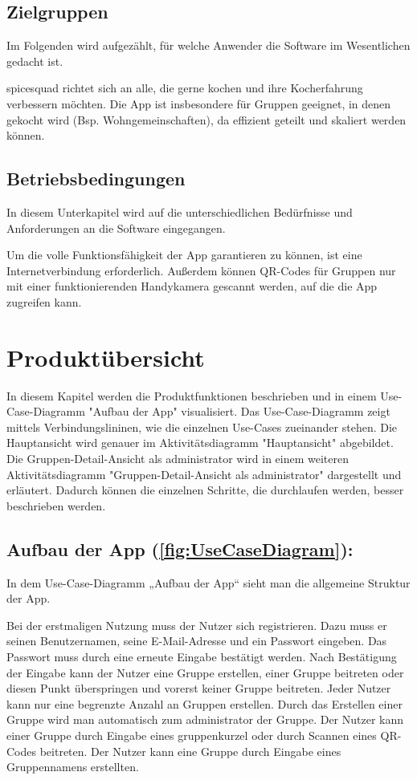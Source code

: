 \documentclass[parskip=full]{scrartcl}
\begin{document}
\subsection{Zielgruppen}
Im Folgenden wird aufgezählt, für welche Anwender die Software im Wesentlichen gedacht ist. \par
\gls{spicesquad} richtet sich an alle, die gerne kochen und ihre Kocherfahrung verbessern möchten.
Die App ist insbesondere für Gruppen geeignet, in denen gekocht wird (Bsp. Wohngemeinschaften), da  effizient geteilt und skaliert werden können.

\subsection{Betriebsbedingungen}
In diesem Unterkapitel wird auf die unterschiedlichen Bedürfnisse und Anforderungen an die Software eingegangen. \par
Um die volle Funktionsfähigkeit der App garantieren zu können, ist eine Internetverbindung erforderlich. Außerdem können QR-Codes für Gruppen nur mit einer funktionierenden Handykamera gescannt werden, auf die die App zugreifen kann.

\newpage
\section{Produktübersicht}
In diesem Kapitel werden die Produktfunktionen beschrieben und in einem Use-Case-Diagramm "Aufbau der App" visualisiert.
Das Use-Case-Diagramm zeigt mittels Verbindungslininen, wie die einzelnen Use-Cases zueinander stehen.
Die Hauptansicht wird genauer im Aktivitätsdiagramm "Hauptansicht" abgebildet.
Die Gruppen-Detail-Ansicht als \gls{administrator} wird in einem weiteren Aktivitätsdiagramm "Gruppen-Detail-Ansicht als \gls{administrator}" dargestellt und erläutert.
Dadurch können die einzelnen Schritte, die durchlaufen werden, besser beschrieben werden.


\subsection{Aufbau der App (\autoref{fig:UseCaseDiagram}):}

In dem Use-Case-Diagramm „Aufbau der App“ sieht man die allgemeine Struktur der App.

Bei der erstmaligen Nutzung muss der Nutzer sich registrieren. Dazu muss er seinen Benutzernamen, seine E-Mail-Adresse und ein Passwort eingeben.
Das Passwort muss durch eine erneute Eingabe bestätigt werden.
Nach Bestätigung der Eingabe kann der Nutzer eine Gruppe erstellen, einer Gruppe beitreten oder diesen Punkt überspringen und vorerst keiner Gruppe beitreten. Jeder Nutzer kann nur eine begrenzte Anzahl an Gruppen erstellen.
Durch das Erstellen einer Gruppe wird man automatisch zum \gls{administrator} der Gruppe.
Der Nutzer kann einer Gruppe durch Eingabe eines \gls{gruppenkurzel} oder durch Scannen eines QR-Codes beitreten.
Der Nutzer kann eine Gruppe durch Eingabe eines Gruppennamens erstellten.
\end{document}
